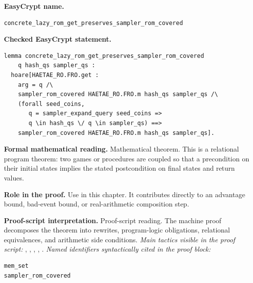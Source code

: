 \begin{formaltheorem}
\noindent\textbf{EasyCrypt name.}
\begin{lstlisting}[language=EasyCrypt,basicstyle=\ttfamily\scriptsize]
concrete_lazy_rom_get_preserves_sampler_rom_covered
\end{lstlisting}
\noindent\textbf{Checked EasyCrypt statement.}
\begin{lstlisting}[language=EasyCrypt,basicstyle=\ttfamily\scriptsize]
lemma concrete_lazy_rom_get_preserves_sampler_rom_covered
    q hash_qs sampler_qs :
  hoare[HAETAE_RO.FRO.get :
    arg = q /\
    sampler_rom_covered HAETAE_RO.FRO.m hash_qs sampler_qs /\
    (forall seed_coins,
       q = sampler_expand_query seed_coins =>
       q \in hash_qs \/ q \in sampler_qs) ==>
    sampler_rom_covered HAETAE_RO.FRO.m hash_qs sampler_qs].
\end{lstlisting}
\noindent\textbf{Formal mathematical reading.}
Mathematical theorem. This is a relational program theorem: two games or procedures are coupled so that a precondition on their initial states implies the stated postcondition on final states and return values.

\noindent\textbf{Role in the proof.}
Use in this chapter. It contributes directly to an advantage bound, bad-event bound, or real-arithmetic composition step.

\noindent\textbf{Proof-script interpretation.}
Proof-script reading. The machine proof decomposes the theorem into rewrites, program-logic obligations, relational equivalences, and arithmetic side conditions.
\emph{Main tactics visible in the proof script:} , , , , .
\emph{Named identifiers syntactically cited in the proof block:}
\begin{lstlisting}[language=EasyCrypt,basicstyle=\ttfamily\scriptsize]
mem_set
sampler_rom_covered
\end{lstlisting}

\end{formaltheorem}

